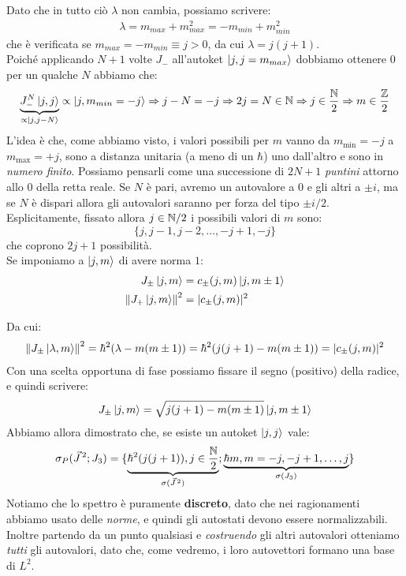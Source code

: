 \documentclass[../../FisicaTeorica.tex]{subfiles}
\begin{document}
Dato che in tutto ciò $\lambda$ non cambia, possiamo scrivere:
\begin{align*}
\lambda = m_{max} + m_{max}^2 = -m_{min} + m_{min}^2
\end{align*}
che è verificata se $m_{max}=-m_{min} \equiv j > 0$, da cui $\lambda=j(j+1)$.\\
Poiché applicando $N+1$ volte $J_-$ all'autoket $\Ket{j,j=m_{max}}$ dobbiamo ottenere $0$ per un qualche $N$ abbiamo che:
\[
\underbrace{J_-^N \Ket{j,j}}_{\propto \Ket{j, j-N}} \propto \Ket{j, m_{min} =-j} \Rightarrow  j-N = -j \Rightarrow  2j = N \in \mathbb{N} \Rightarrow  j \in \frac{\mathbb{N}}{2} \Rightarrow  m \in \frac{\mathbb{Z}}{2}
\]
L'idea è che, come abbiamo visto, i valori possibili per $m$ vanno da $m_{\min}=-j$ a $m_{\max}=+j$, sono a distanza unitaria (a meno di un $\hbar$) uno dall'altro e sono in \textit{numero finito}. Possiamo pensarli come una successione di $2N+1$ \textit{puntini}  attorno allo $0$ della retta reale. Se $N$ è pari, avremo un autovalore a $0$ e gli altri a $\pm i$, ma se $N$ è dispari allora gli autovalori saranno per forza del tipo $\pm i/2$.\\


Esplicitamente, fissato allora $j \in \mathbb{N}/2$ i possibili valori di $m$ sono:
\[
\{j, j-1, j-2, \dots, -j+1, -j\}
\]
che coprono $2j+1$ possibilità.\\
Se imponiamo a $\Ket{j,m}$ di avere norma $1$: %
\begin{align*}
J_\pm \Ket{j,m} &= c_\pm (j,m) \Ket{j, m\pm 1}\\
\left\lVert J_+ \Ket{j,m}\right\rVert^2&=|c_\pm (j,m)|^2
\end{align*}

Da cui:
\begin{align*}
\left\lVert J_\pm \Ket{\lambda,m}\right\rVert^2=\hbar^2(\lambda-m(m\pm 1)) =\hbar^2(j(j+1)-m(m\pm 1)) = |c_{\pm}(j,m)|^2
\end{align*}
Con una scelta opportuna di fase possiamo fissare il segno (positivo) della radice, e quindi scrivere:
\[
J_\pm \Ket{j,m}=\sqrt{j(j+1)-m(m\pm 1)} \Ket{j, m\pm 1}
\]
Abbiamo allora dimostrato che, se esiste un autoket $\Ket{j,j}$  vale: 
\[
\sigma_P(\vec{J}^{\,2}; J_3) = \{\underbrace{ \hbar^2(j(j+1)), j\in \frac{\mathbb{N}}{2}}_{\sigma(\vec{J}^{\,2})}; \underbrace{\hbar m , m = -j, -j+1, \dots, j}_{\sigma(J_3)} \}
\]
Notiamo che lo spettro è puramente \textbf{discreto}, dato che nei ragionamenti abbiamo usato delle \textit{norme}, e quindi gli autostati devono essere normalizzabili. Inoltre partendo da un punto qualsiasi e \textit{costruendo} gli altri autovalori otteniamo \textit{tutti} gli autovalori, dato che, come vedremo, i loro autovettori formano una base di $L^2$.\\
\end{document}

